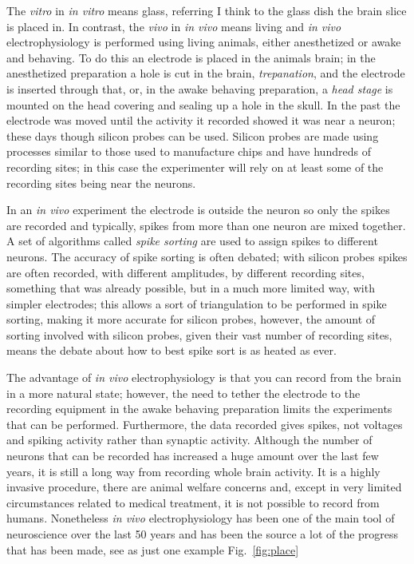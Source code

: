 \documentclass[12pt]{article}
\begin{document}
The \textsl{vitro} in \textsl{in vitro} means glass, referring I think
to the glass dish the brain slice is placed in. In contrast, the
\textsl{vivo} in \textsl{in vivo} means living and \textsl{in vivo}
electrophysiology is performed using living animals, either
anesthetized or awake and behaving. To do this an electrode is placed
in the animals brain; in the anesthetized preparation a hole is cut in
the brain, \textsl{trepanation}, and the electrode is inserted through
that, or, in the awake behaving preparation, a \textsl{head stage} is
mounted on the head covering and sealing up a hole in the skull. In
the past the electrode was moved until the activity it recorded showed
it was near a neuron; these days though silicon probes can be
used. Silicon probes are made using processes similar to those used to
manufacture chips and have hundreds of recording sites; in this case
the experimenter will rely on at least some of the recording sites
being near the neurons.

In an \textsl{in vivo} experiment the electrode is outside the neuron
so only the spikes are recorded and typically, spikes from more than
one neuron are mixed together. A set of algorithms called
\textsl{spike sorting} are used to assign spikes to different
neurons. The accuracy of spike sorting is often debated; with silicon
probes spikes are often recorded, with different amplitudes, by
different recording sites, something that was already possible, but in
a much more limited way, with simpler electrodes; this allows a sort
of triangulation to be performed in spike sorting, making it more
accurate for silicon probes, however, the amount of sorting involved
with silicon probes, given their vast number of recording sites, means
the debate about how to best spike sort is as heated as ever.

The advantage of \textsl{in vivo} electrophysiology is that you can
record from the brain in a more natural state; however, the need to
tether the electrode to the recording equipment in the awake behaving
preparation limits the experiments that can be performed. Furthermore,
the data recorded gives spikes, not voltages and spiking activity
rather than synaptic activity. Although the number of neurons that can
be recorded has increased a huge amount over the last few years, it is
still a long way from recording whole brain activity. It is a highly
invasive procedure, there are animal welfare concerns and, except in
very limited circumstances related to medical treatment, it is not
possible to record from humans. Nonetheless \textsl{in vivo}
electrophysiology has been one of the main tool of neuroscience over
the last 50 years and has been the source a lot of the progress that
has been made, see as just one example Fig.~\ref{fig:place}
\end{document}
